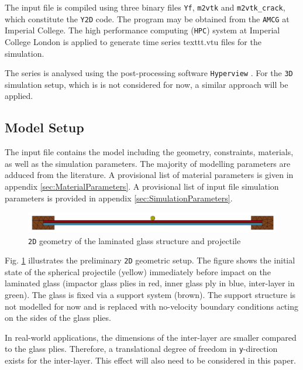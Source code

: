 \documentclass[12pt,twoside]{article}
\theoremstyle{break}
\begin{document}
\bigbreak
The input file is compiled using three binary files \texttt{Yf}, \texttt{m2vtk} and \texttt{m2vtk\_crack}, which constitute the \texttt{Y2D} code. The program may be obtained from the \texttt{AMCG} at Imperial College. The high performance computing (\texttt{HPC}) system at Imperial College London is applied to generate time series texttt{.vtu} files for the simulation. 

\bigbreak
The series is analysed using the post-processing software \texttt{Hyperview} \cite{Hyp17}. For the \texttt{3D} simulation setup, which is is not considered for now, a similar approach will be applied.

\subsection{Model Setup}
\label{subsec:ModelSetup}

The input file contains the model including the geometry, constraints, materials, as well as the simulation parameters. The majority of modelling parameters are adduced from the literature. A provisional list of material parameters is given in appendix \ref{sec:MaterialParameters}. A provisional list of input file simulation parameters is provided in appendix \ref{sec:SimulationParameters}.

\begin{figure}[h!]
    \centering
    \includegraphics[width=\textwidth]{Geometry}
    \caption{\texttt{2D} geometry of the laminated glass structure and projectile \cite{Che18}}
    \label{fig:geometry}
\end{figure}

Fig. \ref{fig:geometry} illustrates the preliminary \texttt{2D} geometric setup. The figure shows the initial state of the spherical projectile (yellow) immediately before impact on the laminated glass (impactor glass plies in red, inner glass ply in blue, inter-layer in green). The glass is fixed via a support system (brown). The support structure is not modelled for now and is replaced with no-velocity boundary conditions acting on the sides of the glass plies. 

\bigbreak
In real-world applications, the dimensions of the inter-layer are smaller compared to the glass plies. Therefore, a translational degree of freedom in \texttt{y}-direction exists for the inter-layer. This effect will also need to be considered in this paper.
\end{document}
